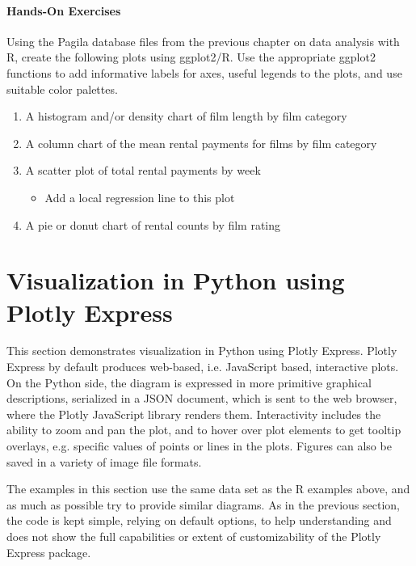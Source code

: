 \begin{tcolorbox}[colback=code]
\paragraph*{Hands-On Exercises}

Using the Pagila database files from the previous chapter on data analysis with R, create the following plots using ggplot2/R. Use the appropriate ggplot2 functions to add informative labels for axes, useful legends to the plots, and use suitable color palettes. 

\begin{enumerate}
   \item A histogram and/or density chart of film length by film category
   \item A column chart of the mean rental payments for films by film category
   \item A scatter plot of total rental payments by week
   \begin{itemize}
      \item Add a local regression line to this plot
   \end{itemize}
   \item A pie or donut chart of rental counts by film rating
\end{enumerate}
\end{tcolorbox}

\FloatBarrier

\section{Visualization in Python using Plotly Express}

This section demonstrates visualization in Python using Plotly Express. Plotly Express by default produces web-based, i.e. JavaScript based, interactive plots. On the Python side, the diagram is expressed in more primitive graphical descriptions, serialized in a JSON document, which is sent to the web browser, where the Plotly JavaScript library renders them. Interactivity includes the ability to zoom and pan the plot, and to hover over plot elements to get tooltip overlays, e.g. specific values of points or lines in the plots. Figures can also be saved in a variety of image file formats.

The examples in this section use the same data set as the R examples above, and as much as possible try to provide similar diagrams. As in the previous section, the code is kept simple, relying on default options, to help understanding and does not show the full capabilities or extent of customizability of the Plotly Express package. 

